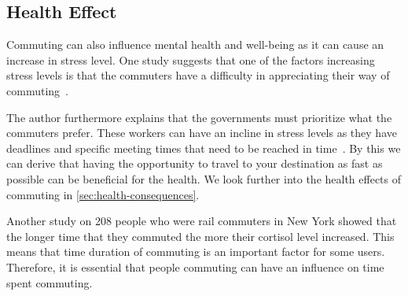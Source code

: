\subsection{Health Effect}\label{subsec:health-effect}

Commuting can also influence mental health and well-being as it can cause an increase in stress level.
One study suggests that one of the factors increasing stress levels is that the commuters have a difficulty in
appreciating their way of commuting~\cite{koslowsky2013}.

The author furthermore explains that the governments must prioritize what the commuters prefer.
These workers can have an incline in stress levels as they have deadlines and specific meeting times that need to be
reached in time~\cite{koslowsky2013}.
By this we can derive that having the opportunity to travel to your destination as fast as possible can be beneficial
for the health.
We look further into the health effects of commuting in \ref{sec:health-consequences}.

Another study on 208 people who were rail commuters in New York showed that the longer time that they commuted the more
their cortisol level increased.
This means that time duration of commuting is an important factor for some users.
Therefore, it is essential that people commuting can have an influence on time spent commuting.


